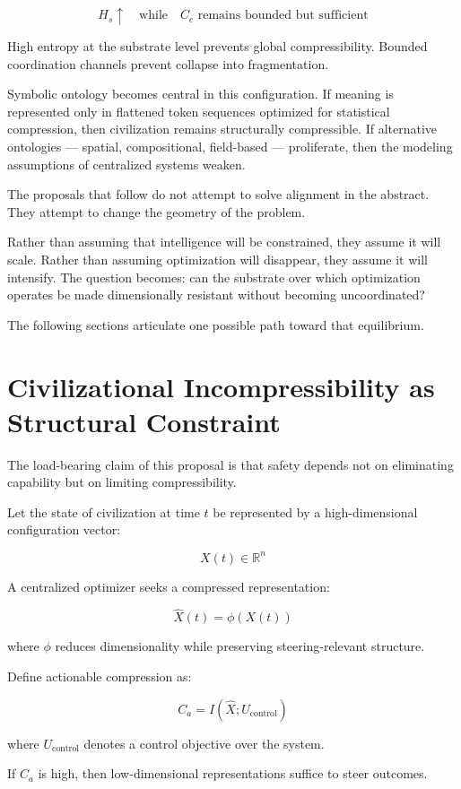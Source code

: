 \documentclass[12pt]{article}
\begin{document}
\[
H_s \uparrow \quad \text{while} \quad C_c \text{ remains bounded but sufficient}
\]

High entropy at the substrate level prevents global compressibility. Bounded coordination channels prevent collapse into fragmentation.

Symbolic ontology becomes central in this configuration. If meaning is represented only in flattened token sequences optimized for statistical compression, then civilization remains structurally compressible. If alternative ontologies — spatial, compositional, field-based — proliferate, then the modeling assumptions of centralized systems weaken.

The proposals that follow do not attempt to solve alignment in the abstract. They attempt to change the geometry of the problem.

Rather than assuming that intelligence will be constrained, they assume it will scale. Rather than assuming optimization will disappear, they assume it will intensify. The question becomes: can the substrate over which optimization operates be made dimensionally resistant without becoming uncoordinated?

The following sections articulate one possible path toward that equilibrium.

\section{Civilizational Incompressibility as Structural Constraint}

The load-bearing claim of this proposal is that safety depends not on eliminating capability but on limiting compressibility.

Let the state of civilization at time $t$ be represented by a high-dimensional configuration vector:

\[
X(t) \in \mathbb{R}^n
\]

A centralized optimizer seeks a compressed representation:

\[
\hat{X}(t) = \phi(X(t))
\]

where $\phi$ reduces dimensionality while preserving steering-relevant structure.

Define actionable compression as:

\[
C_a = I(\hat{X}; U_{\text{control}})
\]

where $U_{\text{control}}$ denotes a control objective over the system.

If $C_a$ is high, then low-dimensional representations suffice to steer outcomes.
\end{document}
